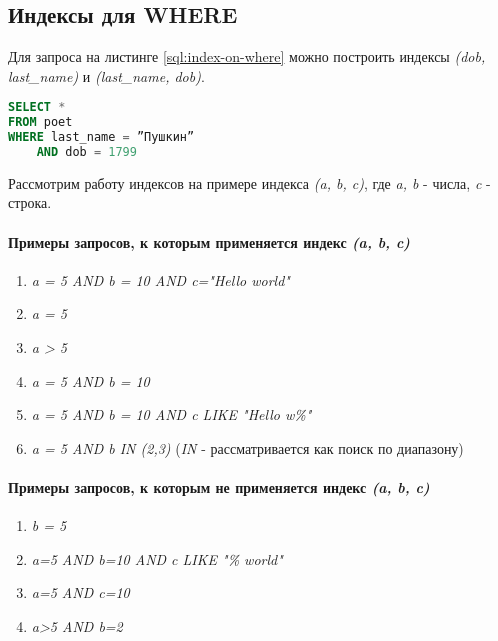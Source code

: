\subsection{Индексы для WHERE}

Для запроса на листинге \ref{sql:index-on-where} можно построить индексы \textit{(dob, last\_name)} и \textit{(last_name, dob)}.
\begin{lstlisting}[language=sql, label=sql:index-on-where, caption={запрос для index-on-where}]
SELECT * 
FROM poet
WHERE last_name = ”Пушкин” 
    AND dob = 1799
\end{lstlisting}

Рассмотрим работу индексов на примере индекса \textit{(a, b, c)}, где \textit{a, b} - числа, \textit{c} - строка.

\paragraph{Примеры запросов, к которым применяется индекс \textit{(a, b, c)}}

\begin{enumerate}
\item \textit{a = 5 AND b = 10 AND c="Hello world"}
\item \textit{a = 5}
\item \textit{a > 5}  
\item \textit{a = 5 AND b = 10} 
\item \textit{a = 5 AND b = 10 AND c LIKE "Hello w\%"} 
\item \textit{a = 5 AND b IN (2,3)} (\textit{IN} - рассматривается как поиск по диапазону)
\end{enumerate}

\paragraph{Примеры запросов, к которым не применяется индекс \textit{(a, b, c)}}

\begin{enumerate}
\item \textit{b = 5}
\item \textit{a=5 AND b=10 AND c LIKE "\% world"}
\item \textit{a=5 AND c=10}
\item \textit{a>5 AND b=2}
\end{enumerate}


